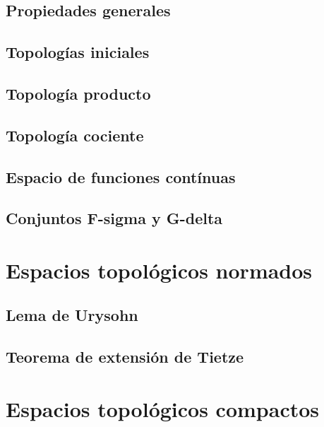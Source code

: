 \documentclass[12pt,]{krantz}
\theoremstyle{definition}
\theoremstyle{definition}
\theoremstyle{definition}
\theoremstyle{remark}
\begin{document}
\section{Propiedades generales}\label{propiedades-generales}

\section{Topologías iniciales}\label{topologias-iniciales}

\section{Topología producto}\label{topologia-producto}

\section{Topología cociente}\label{topologia-cociente}

\section{Espacio de funciones
contínuas}\label{espacio-de-funciones-continuas}

\section{Conjuntos F-sigma y G-delta}\label{conjuntos-f-sigma-y-g-delta}

\chapter{Espacios topológicos
normados}\label{espacios-topologicos-normados}

\section{Lema de Urysohn}\label{lema-de-urysohn}

\section{Teorema de extensión de
Tietze}\label{teorema-de-extension-de-tietze}

\chapter{Espacios topológicos
compactos}\label{espacios-topologicos-compactos}
\end{document}
